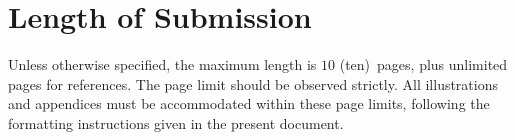 \documentclass[]{article}
\newcommand{\paperlength}{$10$ (ten)}
\newcommand{\shortpaperlength}{$6$ (six)}
\begin{document}
\section{Length of Submission}
\label{sec:length}

Unless otherwise specified, the maximum length is \paperlength~pages,
plus unlimited pages for references.
The page limit should be observed strictly. All illustrations and
appendices must be accommodated within these page limits, following
the formatting instructions given in the present document.

\small



\end{document}
